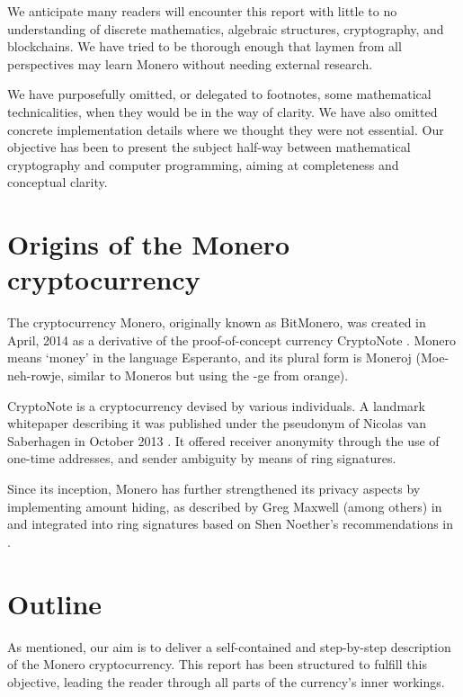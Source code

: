We anticipate many readers will encounter this report with little to no understanding of discrete mathematics, algebraic structures, cryptography, and blockchains. We have tried to be thorough enough that laymen from all perspectives may learn Monero without needing external research.

We have purposefully omitted, or delegated to footnotes, some mathematical technicalities, when they would be in the way of clarity. We have also omitted concrete implementation details where we thought they were not essential. Our objective has been to present the subject half-way between mathematical cryptography and computer programming, aiming at completeness and conceptual clarity.



\section{Origins of the Monero cryptocurrency}

The cryptocurrency Monero, originally known as BitMonero, was created in April, 2014 as a derivative of the proof-of-concept currency CryptoNote \cite{bitmonero-launched}. Monero means `money' in the language Esperanto, and its plural form is Moneroj (Moe-neh-rowje, similar to Moneros but using the -ge from orange).

CryptoNote is a cryptocurrency devised by various individuals. A landmark whitepaper describing it was published under the pseudonym of Nicolas van Saberhagen in October 2013 \cite{cryptoNoteWhitePaper}. It offered receiver anonymity through the use of one-time addresses, and sender ambiguity by means of ring signatures.

Since its inception, Monero has further strengthened its privacy aspects by implementing amount hiding, as described by Greg Maxwell (among others) in \cite{Signatures2015BorromeanRS} and integrated into ring signatures based on Shen Noether's recommendations in \cite{ledger34}.
  

\section{Outline}

As mentioned, our aim is to deliver a self-contained and step-by-step description of the Monero cryptocurrency. This report has been structured to fulfill this objective, leading the reader through all parts of the currency’s inner workings.
\\

